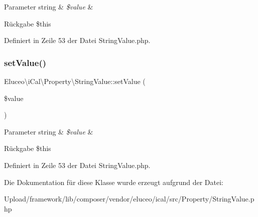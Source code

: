 \begin{DoxyParams}[1]{Parameter}
string & {\em \$value} & \\
\hline
\end{DoxyParams}
\begin{DoxyReturn}{Rückgabe}
\$this 
\end{DoxyReturn}


Definiert in Zeile 53 der Datei String\+Value.\+php.

\mbox{\label{class_eluceo_1_1i_cal_1_1_property_1_1_string_value_ae8d54aad71b757776262b478a4be042d}} 
\subsubsection{\texorpdfstring{set\+Value()}{setValue()}\hspace{0.1cm}{\footnotesize\ttfamily [3/3]}}
{\footnotesize\ttfamily Eluceo\textbackslash{}i\+Cal\textbackslash{}\+Property\textbackslash{}\+String\+Value\+::set\+Value (\begin{DoxyParamCaption}\item[{}]{\$value }\end{DoxyParamCaption})}


\begin{DoxyParams}[1]{Parameter}
string & {\em \$value} & \\
\hline
\end{DoxyParams}
\begin{DoxyReturn}{Rückgabe}
\$this 
\end{DoxyReturn}


Definiert in Zeile 53 der Datei String\+Value.\+php.



Die Dokumentation für diese Klasse wurde erzeugt aufgrund der Datei\+:\begin{DoxyCompactItemize}
\item 
Upload/framework/lib/composer/vendor/eluceo/ical/src/\+Property/String\+Value.\+php\end{DoxyCompactItemize}
